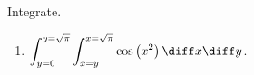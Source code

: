 Integrate.

\begin{enumerate}
\item  \label{problemint_(y=0)^(y=sqrt(pi))int_(x=0)^(x=y)cos x^2 dx dy} $\displaystyle \int_{ y=0}^{ y=\sqrt{\pi}} \int_{x=y}^{x=\sqrt{\pi}} \cos \left( x^2 \right) \diff x\diff y$.
\end{enumerate}